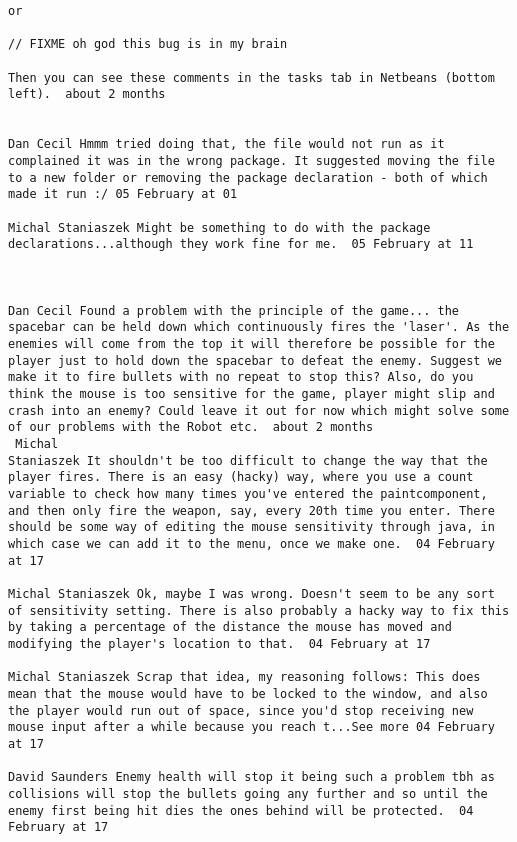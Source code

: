 \begin{verbatim}
or

// FIXME oh god this bug is in my brain

Then you can see these comments in the tasks tab in Netbeans (bottom
left).  about 2 months 


Dan Cecil Hmmm tried doing that, the file would not run as it
complained it was in the wrong package. It suggested moving the file
to a new folder or removing the package declaration - both of which
made it run :/ 05 February at 01

Michal Staniaszek Might be something to do with the package
declarations...although they work fine for me.  05 February at 11



Dan Cecil Found a problem with the principle of the game... the
spacebar can be held down which continuously fires the 'laser'. As the
enemies will come from the top it will therefore be possible for the
player just to hold down the spacebar to defeat the enemy. Suggest we
make it to fire bullets with no repeat to stop this? Also, do you
think the mouse is too sensitive for the game, player might slip and
crash into an enemy? Could leave it out for now which might solve some
of our problems with the Robot etc.  about 2 months 
 Michal
Staniaszek It shouldn't be too difficult to change the way that the
player fires. There is an easy (hacky) way, where you use a count
variable to check how many times you've entered the paintcomponent,
and then only fire the weapon, say, every 20th time you enter. There
should be some way of editing the mouse sensitivity through java, in
which case we can add it to the menu, once we make one.  04 February
at 17

Michal Staniaszek Ok, maybe I was wrong. Doesn't seem to be any sort
of sensitivity setting. There is also probably a hacky way to fix this
by taking a percentage of the distance the mouse has moved and
modifying the player's location to that.  04 February at 17

Michal Staniaszek Scrap that idea, my reasoning follows: This does
mean that the mouse would have to be locked to the window, and also
the player would run out of space, since you'd stop receiving new
mouse input after a while because you reach t...See more 04 February
at 17

David Saunders Enemy health will stop it being such a problem tbh as
collisions will stop the bullets going any further and so until the
enemy first being hit dies the ones behind will be protected.  04
February at 17


\end{verbatim}
